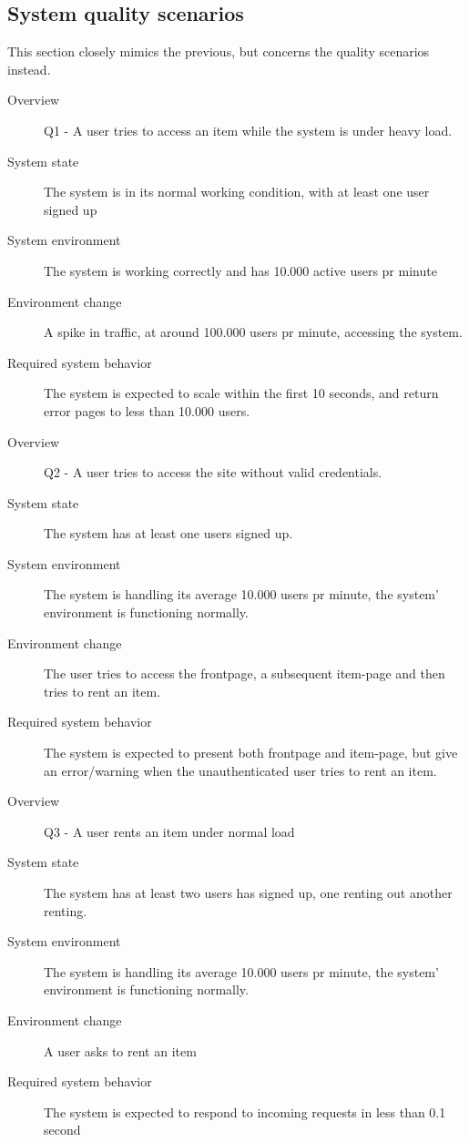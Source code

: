 \documentclass[a4paper,11pt]{report}
\begin{document}
\subsection{System quality scenarios}
\label{sec:syst-qual-scen}
This section closely mimics the previous, but concerns the quality scenarios
instead.

\begin{description}
    \item[Overview] Q1 - A user tries to access an item while the system is
        under heavy load.
    \item[System state] The system is in its normal working condition, with at
        least one user signed up
    \item[System environment] The system is working correctly and has 10.000
        active users pr minute
    \item[Environment change] A spike in traffic, at around 100.000 users pr
        minute, accessing the system.
    \item[Required system behavior] The system is expected to scale within the
        first 10 seconds, and return error pages to less than 10.000 users.
\end{description}

\begin{description}
    \item[Overview] Q2 - A user tries to access the site without valid
        credentials.
    \item[System state] The system has at least one users signed up.
    \item[System environment] The system is handling its average 10.000 users pr
        minute, the system' environment is functioning normally.
    \item[Environment change] The user tries to access the frontpage, a
        subsequent item-page and then tries to rent an item.
    \item[Required system behavior] The system is expected to present both
        frontpage and item-page, but give an error/warning when the
        unauthenticated user tries to rent an item.
\end{description}


\begin{description}
    \item[Overview] Q3 - A user rents an item under normal load
    \item[System state] The system has at least two users has signed up, one
        renting out another renting.
    \item[System environment] The system is handling its average 10.000 users pr
        minute, the system' environment is functioning normally.
    \item[Environment change] A user asks to rent an item
    \item[Required system behavior] The system is expected to respond to
        incoming requests in less than 0.1 second
\end{description}
\end{document}
